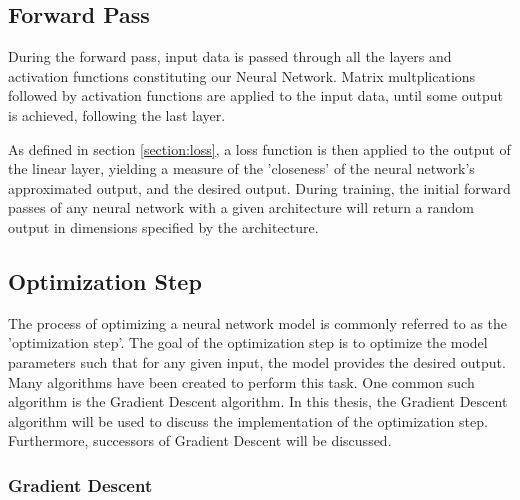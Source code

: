 \subsection{Forward Pass}

During the forward pass, input data is passed through all the layers and activation functions constituting our Neural Network. 
Matrix multplications followed by activation functions are applied to the input data, until some output is achieved, following the last layer.

As defined in section \ref{section:loss}, a loss function is then applied to the output of the linear layer, yielding a measure of the 'closeness' of the neural network's approximated output, and the desired output.
During training, the initial forward passes of any neural network with a given architecture will return a random output in dimensions specified by the architecture.



\subsection{Optimization Step}
\label{subsection:optimizationStep}

The process of optimizing a neural network model is commonly referred to as the 'optimization step'.
The goal of the optimization step is to optimize the model parameters such that for any given input,
the model provides the desired output. Many algorithms have been created to perform this task.
One common such algorithm is the Gradient Descent algorithm. In this thesis, 
the Gradient Descent algorithm will be used to discuss the implementation of the optimization step.
Furthermore, successors of Gradient Descent will be discussed.


\subsubsection{Gradient Descent}

